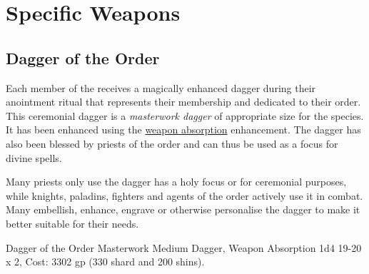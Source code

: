 \section{Specific Weapons}
\label{sec:Weapons}

\subsection{Dagger of the Order}
\label{sec:Dagger of the Order}

Each member of the  receives a magically
enhanced dagger during their anointment ritual that represents their
membership and dedicated to their order. This ceremonial dagger is a
\emph{masterwork dagger} of appropriate size for the species. It has
been enhanced using the \hyperref[sec:Weapon Absorption]{weapon absorption}
enhancement. The dagger has also been blessed by priests of the order
and can thus be used as a focus for divine spells.

Many priests only use the dagger has a holy focus or for ceremonial purposes,
while knights, paladins, fighters and agents of the order actively use it
in combat. Many embellish, enhance, engrave or otherwise personalise the
dagger to make it better suitable for their needs.

\begin{35e}{Dagger of the Order}
  Masterwork Medium Dagger, Weapon Absorption 1d4 19-20 x 2, Cost: 3302
  gp (330 shard and 200 shins).
\end{35e}
